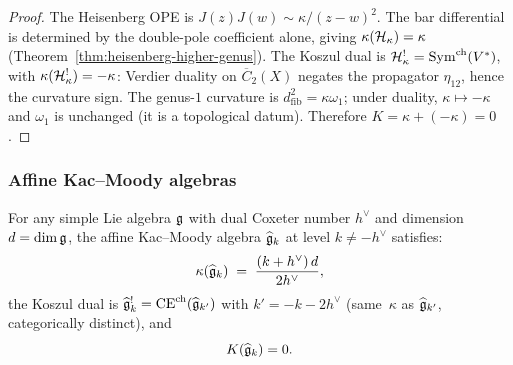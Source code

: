 \begin{proof}
The Heisenberg OPE is $J(z) J(w) \sim \kappa/(z-w)^2$. The bar
differential is determined by the double-pole coefficient alone,
giving $\kappa(\mathcal{H}_\kappa) = \kappa$
(Theorem~\ref{thm:heisenberg-higher-genus}).
The Koszul dual is $\mathcal{H}_\kappa^! = \operatorname{Sym}^{\mathrm{ch}}(V^*)$,
with $\kappa(\mathcal{H}_\kappa^!) = -\kappa$: Verdier duality
on $\overline{C}_2(X)$ negates the propagator $\eta_{12}$, hence
the curvature sign. The genus-$1$ curvature is $d_{\mathrm{fib}}^2 = \kappa \omega_1$;
under duality, $\kappa \mapsto -\kappa$ and $\omega_1$ is unchanged
(it is a topological datum). Therefore $K = \kappa + (-\kappa) = 0$.
\end{proof}

\subsubsection{Affine Kac--Moody algebras}

\begin{theorem}
\label{thm:thqg-IV-km-K}
For any simple Lie algebra $\mathfrak{g}$ with dual Coxeter number $h^\vee$
and dimension $d = \dim\mathfrak{g}$, the affine Kac--Moody algebra
$\widehat{\mathfrak{g}}_k$ at level $k \neq -h^\vee$ satisfies:
\begin{equation}\label{eq:thqg-IV-km-kappa}
\kappa(\widehat{\mathfrak{g}}_k)
\;=\;
\frac{(k + h^\vee)\, d}{2h^\vee},
\end{equation}
the Koszul dual is
$\widehat{\mathfrak{g}}_k^! = \mathrm{CE}^{\mathrm{ch}}(\widehat{\mathfrak{g}}_{k'})$
with $k' = -k - 2h^\vee$
(same~$\kappa$ as $\widehat{\mathfrak{g}}_{k'}$, categorically distinct), and
\begin{equation}\label{eq:thqg-IV-km-K}
K(\widehat{\mathfrak{g}}_k) = 0.
\end{equation}
\end{theorem}

